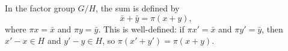 In the factor group $G/H$, the sum is defined by
$$\bar{x} + \bar{y} = \pi(x + y),$$
where $\pi x = \bar{x}$ and $\pi y = \bar{y}$. This is well-defined: if $\pi x' = \bar{x}$ and $\pi y' = \bar{y}$, then $x' - x \in H$ and $y' - y \in H$, so $\pi(x' + y') = \pi(x + y)$.
